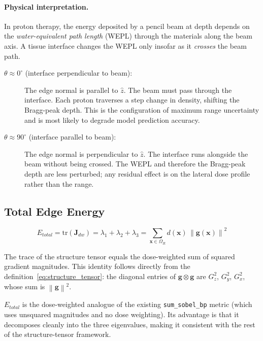 \documentclass[11pt,a4paper]{article}
\newcommand{\vx}{\mathbf{x}}
\newcommand{\vg}{\mathbf{g}}
\newcommand{\vJ}{\mathbf{J}}
\newcommand{\norm}[1]{\left\|#1\right\|}
\begin{document}
\paragraph{Physical interpretation.}
In proton therapy, the energy deposited by a pencil beam at depth depends
on the \emph{water-equivalent path length} (WEPL) through the materials
along the beam axis.
A tissue interface changes the WEPL only insofar as it \emph{crosses} the
beam path.

\begin{description}
    \item[$\theta \approx 0^\circ$ (interface perpendicular to beam):]
        The edge normal is parallel to $\hat{z}$.
        The beam must pass through the interface.
        Each proton traverses a step change in density, shifting the
        Bragg-peak depth.
        This is the configuration of maximum range uncertainty and is
        most likely to degrade model prediction accuracy.

    \item[$\theta \approx 90^\circ$ (interface parallel to beam):]
        The edge normal is perpendicular to $\hat{z}$.
        The interface runs alongside the beam without being crossed.
        The WEPL and therefore the Bragg-peak depth are less perturbed;
        any residual effect is on the lateral dose profile rather than
        the range.
\end{description}

\subsection{Total Edge Energy}

\begin{equation}
    \boxed{E_{total} = \mathrm{tr}(\vJ_{dw}) = \lambda_1 + \lambda_2 + \lambda_3
           = \sum_{\vx \in \Omega_R} d(\vx)\,\norm{\vg(\vx)}^2}
    \label{eq:total_energy}
\end{equation}

The trace of the structure tensor equals the dose-weighted sum of squared
gradient magnitudes.
This identity follows directly from the definition~\eqref{eq:structure_tensor}:
the diagonal entries of $\vg\otimes\vg$ are $G_z^2$, $G_y^2$, $G_x^2$,
whose sum is $\norm{\vg}^2$.

$E_{total}$ is the dose-weighted analogue of the existing
\texttt{sum\_sobel\_bp} metric (which uses unsquared magnitudes and no dose
weighting).
Its advantage is that it decomposes cleanly into the three eigenvalues,
making it consistent with the rest of the structure-tensor framework.
\end{document}

